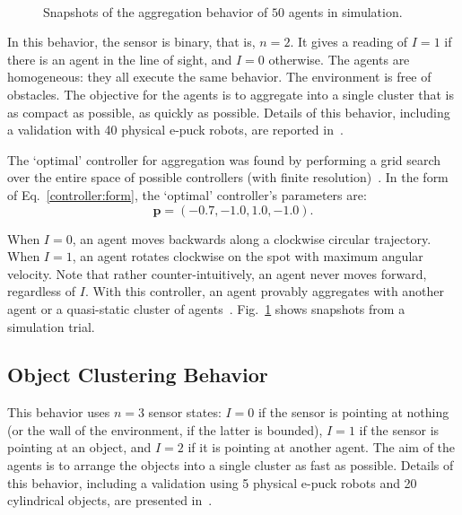 \captionsetup[subfigure]{labelformat=empty}  
\begin{figure}[!t]
	\centering
	\\
	\caption{Snapshots of the aggregation behavior of $50$ agents in simulation. }
	\label{fig:aggregation_snapshoot}
\end{figure}
%
In this behavior, the sensor is binary, that is, $n=2$. It gives a reading of $I=1$ if there is an agent in the line of sight, and $I=0$ otherwise. The agents are homogeneous: they all execute the same behavior. The environment is free of obstacles. The objective for the agents is to aggregate into a single cluster that is as compact as possible, as quickly as possible. Details of this behavior, including a validation with 40 physical e-puck robots, are reported in~\cite{Gauci2014_ijrr}. 

The `optimal' controller for aggregation was found by performing a grid search over the entire space of possible controllers (with finite resolution)~\cite{Gauci2014_ijrr}. In the form of Eq.~\eqref{controller:form}, the `optimal' controller's parameters are:
\begin{equation}\label{eq:aggregation_optimal_controller}
\mathbf{p} = \left(-0.7, -1.0, 1.0, -1.0\right). 
\end{equation}

When $I=0$, an agent moves backwards along a clockwise circular trajectory. When $I=1$, an agent rotates clockwise on the spot with maximum angular velocity. Note that rather counter-intuitively, an agent never moves forward, regardless of $I$. With this controller, an agent provably aggregates with another agent or a quasi-static cluster of agents~\cite{Gauci2014_ijrr}. Fig.~\ref{fig:aggregation_snapshoot} shows snapshots from a simulation trial.

\subsection{Object Clustering Behavior}
This behavior uses $n=3$ sensor states: $I=0$ if the sensor is pointing at nothing (or the wall of the environment, if the latter is bounded), $I=1$ if the sensor is pointing at an object, and $I=2$ if it is pointing at another agent. The aim of the agents is to arrange the objects into a single cluster as fast as possible. Details of this behavior, including a validation using 5 physical e-puck robots and 20 cylindrical objects, are presented in~\cite{Melvin2014_aamas}.

